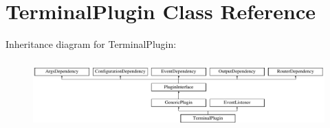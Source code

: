 \hypertarget{classTerminalPlugin}{\section{Terminal\-Plugin Class Reference}
\label{classTerminalPlugin}
}
Inheritance diagram for Terminal\-Plugin\-:\begin{figure}[H]
\begin{center}
\leavevmode
\includegraphics[height=2.666667cm]{classTerminalPlugin}
\end{center}
\end{figure}
